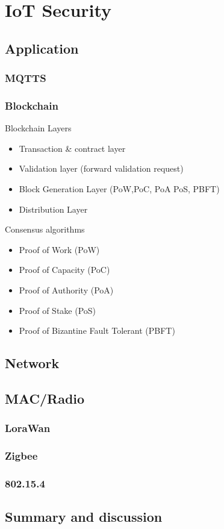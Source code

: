 \section{IoT Security}

\subsection{Application}

\subsubsection{MQTTS}

\subsubsection{Blockchain}

Blockchain Layers
\begin{itemize}
	\item Transaction \& contract layer
	\item Validation layer (forward validation request)
	\item Block Generation Layer (PoW,PoC, PoA PoS, PBFT)
	\item Distribution Layer
	\\
\end{itemize}

Consensus algorithms
\begin{itemize}
	\item Proof of Work (PoW)
	\item Proof of Capacity (PoC)
	\item Proof of Authority (PoA)
	\item Proof of Stake (PoS)
	\item Proof of Bizantine Fault Tolerant (PBFT)
\end{itemize}


\subsection{Network}

\subsection{MAC/Radio}

\subsubsection{LoraWan}

\subsubsection{Zigbee}

\subsubsection{802.15.4}


\subsection{Summary and discussion}
